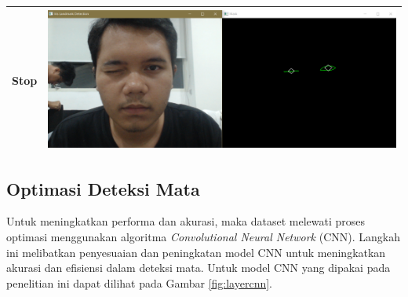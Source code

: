 \begin{table}[H]
\begin{tabular}{|c|c|}
        Stop               & \includegraphics[scale=0.25]{gambar/bab3/stop.png}  \\ \hline
    \end{tabular}
\end{table}

\subsection{Optimasi Deteksi Mata}

Untuk meningkatkan performa dan akurasi, maka dataset melewati proses optimasi menggunakan algoritma \emph{Convolutional Neural Network} (CNN). Langkah ini melibatkan penyesuaian dan peningkatan model CNN untuk meningkatkan akurasi dan efisiensi dalam deteksi mata. Untuk model CNN yang dipakai pada penelitian ini dapat dilihat pada Gambar \ref{fig:layercnn}.

